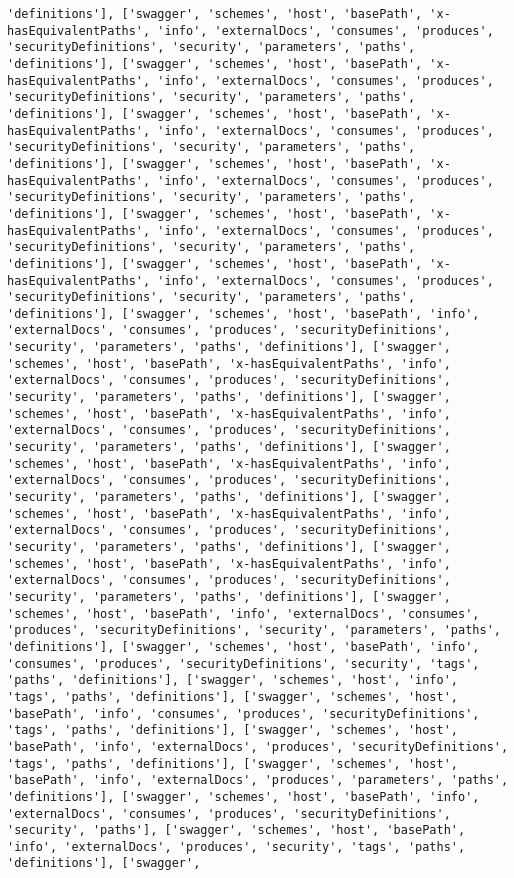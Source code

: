 \documentclass[11pt]{article}
\begin{document}
\begin{Verbatim}[commandchars=\\\{\}]
'definitions'], ['swagger', 'schemes', 'host', 'basePath', 'x-hasEquivalentPaths', 'info', 'externalDocs', 'consumes', 'produces', 'securityDefinitions', 'security', 'parameters', 'paths', 'definitions'], ['swagger', 'schemes', 'host', 'basePath', 'x-hasEquivalentPaths', 'info', 'externalDocs', 'consumes', 'produces', 'securityDefinitions', 'security', 'parameters', 'paths', 'definitions'], ['swagger', 'schemes', 'host', 'basePath', 'x-hasEquivalentPaths', 'info', 'externalDocs', 'consumes', 'produces', 'securityDefinitions', 'security', 'parameters', 'paths', 'definitions'], ['swagger', 'schemes', 'host', 'basePath', 'x-hasEquivalentPaths', 'info', 'externalDocs', 'consumes', 'produces', 'securityDefinitions', 'security', 'parameters', 'paths', 'definitions'], ['swagger', 'schemes', 'host', 'basePath', 'x-hasEquivalentPaths', 'info', 'externalDocs', 'consumes', 'produces', 'securityDefinitions', 'security', 'parameters', 'paths', 'definitions'], ['swagger', 'schemes', 'host', 'basePath', 'x-hasEquivalentPaths', 'info', 'externalDocs', 'consumes', 'produces', 'securityDefinitions', 'security', 'parameters', 'paths', 'definitions'], ['swagger', 'schemes', 'host', 'basePath', 'info', 'externalDocs', 'consumes', 'produces', 'securityDefinitions', 'security', 'parameters', 'paths', 'definitions'], ['swagger', 'schemes', 'host', 'basePath', 'x-hasEquivalentPaths', 'info', 'externalDocs', 'consumes', 'produces', 'securityDefinitions', 'security', 'parameters', 'paths', 'definitions'], ['swagger', 'schemes', 'host', 'basePath', 'x-hasEquivalentPaths', 'info', 'externalDocs', 'consumes', 'produces', 'securityDefinitions', 'security', 'parameters', 'paths', 'definitions'], ['swagger', 'schemes', 'host', 'basePath', 'x-hasEquivalentPaths', 'info', 'externalDocs', 'consumes', 'produces', 'securityDefinitions', 'security', 'parameters', 'paths', 'definitions'], ['swagger', 'schemes', 'host', 'basePath', 'x-hasEquivalentPaths', 'info', 'externalDocs', 'consumes', 'produces', 'securityDefinitions', 'security', 'parameters', 'paths', 'definitions'], ['swagger', 'schemes', 'host', 'basePath', 'x-hasEquivalentPaths', 'info', 'externalDocs', 'consumes', 'produces', 'securityDefinitions', 'security', 'parameters', 'paths', 'definitions'], ['swagger', 'schemes', 'host', 'basePath', 'info', 'externalDocs', 'consumes', 'produces', 'securityDefinitions', 'security', 'parameters', 'paths', 'definitions'], ['swagger', 'schemes', 'host', 'basePath', 'info', 'consumes', 'produces', 'securityDefinitions', 'security', 'tags', 'paths', 'definitions'], ['swagger', 'schemes', 'host', 'info', 'tags', 'paths', 'definitions'], ['swagger', 'schemes', 'host', 'basePath', 'info', 'consumes', 'produces', 'securityDefinitions', 'tags', 'paths', 'definitions'], ['swagger', 'schemes', 'host', 'basePath', 'info', 'externalDocs', 'produces', 'securityDefinitions', 'tags', 'paths', 'definitions'], ['swagger', 'schemes', 'host', 'basePath', 'info', 'externalDocs', 'produces', 'parameters', 'paths', 'definitions'], ['swagger', 'schemes', 'host', 'basePath', 'info', 'externalDocs', 'consumes', 'produces', 'securityDefinitions', 'security', 'paths'], ['swagger', 'schemes', 'host', 'basePath', 'info', 'externalDocs', 'produces', 'security', 'tags', 'paths', 'definitions'], ['swagger', 
\end{Verbatim}
\end{document}

